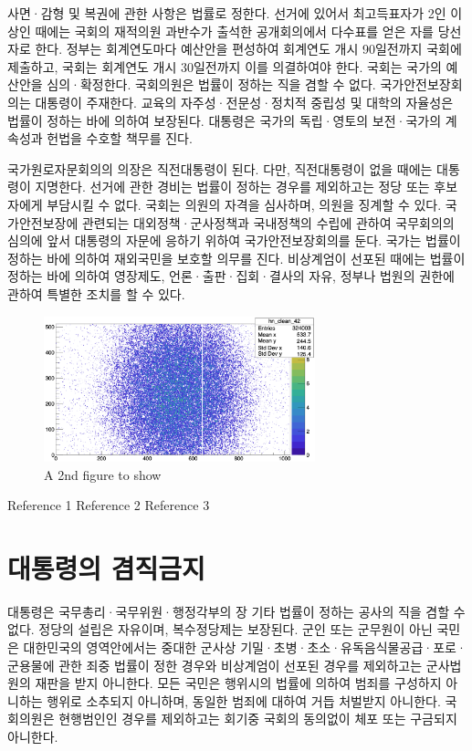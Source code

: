 \documentclass[master, korean]{pnuthesis}
\begin{document}
사면·감형 및 복권에 관한 사항은 법률로 정한다. 선거에 있어서 최고득표자가 2인 이상인 때에는 국회의 재적의원 과반수가 출석한 공개회의에서 다수표를 얻은 자를 당선자로 한다. 정부는 회계연도마다 예산안을 편성하여 회계연도 개시 90일전까지 국회에 제출하고, 국회는 회계연도 개시 30일전까지 이를 의결하여야 한다. 국회는 국가의 예산안을 심의·확정한다. 국회의원은 법률이 정하는 직을 겸할 수 없다. 국가안전보장회의는 대통령이 주재한다. 교육의 자주성·전문성·정치적 중립성 및 대학의 자율성은 법률이 정하는 바에 의하여 보장된다. 대통령은 국가의 독립·영토의 보전·국가의 계속성과 헌법을 수호할 책무를 진다.

국가원로자문회의의 의장은 직전대통령이 된다. 다만, 직전대통령이 없을 때에는 대통령이 지명한다. 선거에 관한 경비는 법률이 정하는 경우를 제외하고는 정당 또는 후보자에게 부담시킬 수 없다. 국회는 의원의 자격을 심사하며, 의원을 징계할 수 있다. 국가안전보장에 관련되는 대외정책·군사정책과 국내정책의 수립에 관하여 국무회의의 심의에 앞서 대통령의 자문에 응하기 위하여 국가안전보장회의를 둔다. 국가는 법률이 정하는 바에 의하여 재외국민을 보호할 의무를 진다. 비상계엄이 선포된 때에는 법률이 정하는 바에 의하여 영장제도, 언론·출판·집회·결사의 자유, 정부나 법원의 권한에 관하여 특별한 조치를 할 수 있다.

\begin{figure}[!h]
	\centering
	\includegraphics[width=0.7\textwidth]{figure/samplefig2.png}
	\caption{A 2nd figure to show}
\end{figure}

%
%

\begin{thebibliography}{00}
	 Reference 1
	 Reference 2
	 Reference 3
\end{thebibliography}

\appendix
\chapter{대통령의 겸직금지}

대통령은 국무총리·국무위원·행정각부의 장 기타 법률이 정하는 공사의 직을 겸할 수 없다. 정당의 설립은 자유이며, 복수정당제는 보장된다. 군인 또는 군무원이 아닌 국민은 대한민국의 영역안에서는 중대한 군사상 기밀·초병·초소·유독음식물공급·포로·군용물에 관한 죄중 법률이 정한 경우와 비상계엄이 선포된 경우를 제외하고는 군사법원의 재판을 받지 아니한다. 모든 국민은 행위시의 법률에 의하여 범죄를 구성하지 아니하는 행위로 소추되지 아니하며, 동일한 범죄에 대하여 거듭 처벌받지 아니한다. 국회의원은 현행범인인 경우를 제외하고는 회기중 국회의 동의없이 체포 또는 구금되지 아니한다.
\end{document}
